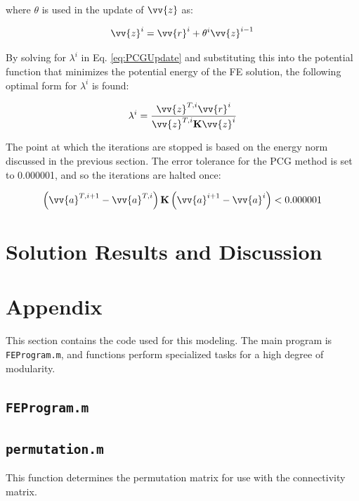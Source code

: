 \documentclass[10pt]{article}
\begin{document}
where \(\theta\) is used in the update of \(\vv{z}\) as:

\begin{equation}
\vv{z}^i=\vv{r}^i+\theta^i\vv{z}^{i-1}
\end{equation}

By solving for \(\lambda^i\) in Eq. \eqref{eq:PCGUpdate} and substituting this into the potential function that minimizes the potential energy of the FE solution, the following optimal form for \(\lambda^i\) is found:

\begin{equation}
\lambda^i=\frac{\vv{z}^{T,i}\vv{r}^i}{\vv{z}^{T,i}\textbf{K}\vv{z}^i}
\end{equation}

The point at which the iterations are stopped is based on the energy norm discussed in the previous section. The error tolerance for the PCG method is set to 0.000001, and so the iterations are halted once:

\begin{equation}
\left(\vv{a}^{T,i+1}-\vv{a}^{T,i}\right)\textbf{K}\left(\vv{a}^{i+1}-\vv{a}^i\right)<0.000001
\end{equation}



\section{Solution Results and Discussion}



\section{Appendix}

This section contains the code used for this modeling. The main program is \texttt{FEProgram.m}, and functions perform specialized tasks for a high degree of modularity.

\subsection{\texttt{FEProgram.m}}


\subsection{\texttt{permutation.m}}
This function determines the permutation matrix for use with the connectivity matrix.

\end{document}
